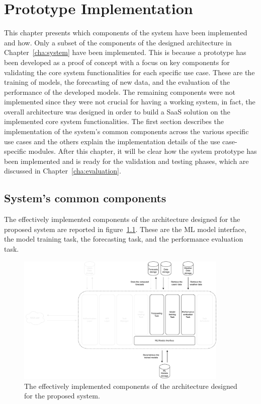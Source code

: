 \chapter{Prototype Implementation}
\label{cha:implementation}
\vspace{0.4 cm}

This chapter presents which components of the system have been implemented and how.
Only a subset of the components of the designed architecture in Chapter~\ref{cha:system} have been implemented.
This is because a prototype has been developed as a proof of concept with a focus on key components for validating the core system functionalities for each specific use case.
These are the training of models, the forecasting of new data, and the evaluation of the performance of the developed models.
The remaining components were not implemented since they were not crucial for having a working system, in fact, the overall architecture was designed in order to build a SaaS solution on the implemented core system functionalities.
The first section describes the implementation of the system's common components across the various specific use cases and the others explain the implementation details of the use case-specific modules.
After this chapter, it will be clear how the system prototype has been implemented and is ready for the validation and testing phases, which are discussed in Chapter~\ref{cha:evaluation}.


\section{System's common components}
\label{sec:componentsimpl}
\vspace{0.2 cm}

The effectively implemented components of the architecture designed for the proposed system are reported in figure~\ref{fig:implementationcomponents}.
These are the ML model interface, the model training task, the forecasting task, and the performance evaluation task.

\begin{figure}[H]
\centering
\includegraphics[width=0.9\textwidth]{images/implementation_components}
\caption{The effectively implemented components of the architecture designed for the proposed system.}
\label{fig:implementationcomponents}
\end{figure}

